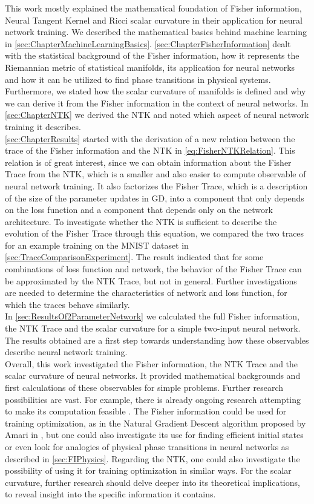 This work mostly explained the mathematical foundation of Fisher information, Neural Tangent Kernel and Ricci scalar curvature in their application for neural network training. We described the mathematical basics behind machine learning in \cref{sec:ChapterMachineLearningBasics}. \cref{sec:ChapterFisherInformation} dealt with the statistical background of the Fisher information, how it represents the Riemannian metric of statistical manifolds, its application for neural networks and how it can be utilized to find phase transitions in physical systems. Furthermore, we stated how the scalar curvature of manifolds is defined and why we can derive it from the Fisher information in the context of neural networks. In \cref{sec:ChapterNTK} we derived the NTK and noted which aspect of neural network training it describes.\\
\cref{sec:ChapterResults} started with the derivation of a new relation between the trace of the Fisher information and the NTK in \cref{eq:FisherNTKRelation}. This relation is of great interest, since we can obtain information about the Fisher Trace from the NTK, which is a smaller and also easier to compute observable of neural network training. It also factorizes the Fisher Trace, which is a description of the size of the parameter updates in GD, into a component that only depends on the loss function and a component that depends only on the network architecture. To investigate whether the NTK is sufficient to describe the evolution of the Fisher Trace through this equation, we compared the two traces for an example training on the MNIST dataset in \cref{sec:TraceComparisonExperiment}. The result indicated that for some combinations of loss function and network, the behavior of the Fisher Trace can be approximated by the NTK Trace, but not in general. Further investigations are needed to determine the characteristics of network and loss function, for which the traces behave similarly.\\
In \cref{sec:ResultsOf2ParameterNetwork} we calculated the full Fisher information, the NTK Trace and the scalar curvature for a simple two-input neural network. The results obtained are a first step towards understanding how these observables describe neural network training.\\
Overall, this work investigated the Fisher information, the NTK Trace and the scalar curvature of neural networks. It provided mathematical backgrounds and first calculations of these observables for simple problems. Further research possibilities are vast. For example, there is already ongoing research attempting to make its computation feasible \cite{EfficientFisherResearch}. The Fisher information could be used for training optimization, as in the Natural Gradient Descent algorithm proposed by Amari in \cite{NGDWorksEfficiently}, but one could also investigate its use for finding efficient initial states or even look for analogies of physical phase transitions in neural networks as described in \cref{sec:FIPhysics}. Regarding the NTK, one could also investigate the possibility of using it for training optimization in similar ways. For the scalar curvature, further research should delve deeper into its theoretical implications, to reveal insight into the specific information it contains. 
